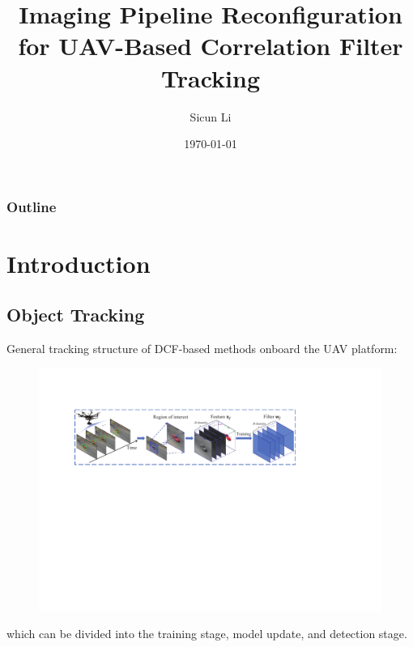 \documentclass{beamer}
\author{Sicun Li}
\title{Imaging Pipeline Reconfiguration for UAV-Based Correlation Filter Tracking}
\institute{School of Microelectronics}
\date{\today}
\begin{document}
\begin{frame}
    \titlepage
\end{frame}

\begin{frame}
    \frametitle{Outline}
    \tableofcontents[sectionstyle=show,subsectionstyle=show/shaded/hide,subsubsectionstyle=show/shaded/hide]
\end{frame}

\section{Introduction}

\subsection{Object Tracking}

\begin{frame}

    General tracking structure of DCF-based methods onboard the UAV platform:

    \begin{figure}[htpb]
        \begin{center}
            \includegraphics[width=0.7\linewidth, trim={100pt 100 100 90}]{fig/tracking_1.pdf}
        \end{center}
    \end{figure}

    which can be divided into the \textcolor{deepred}{training stage}, model update, and detection stage.

\end{frame}
\end{document}
